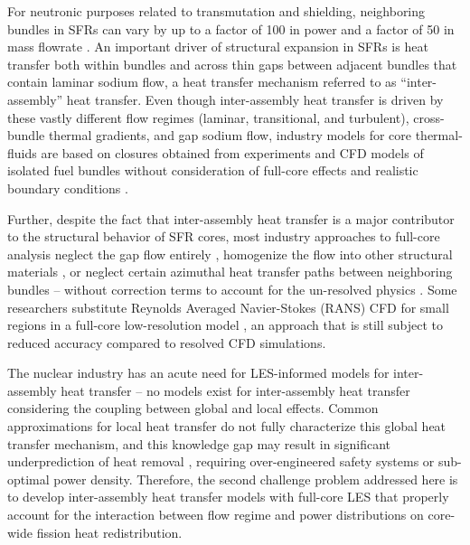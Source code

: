 For neutronic purposes related to transmutation and shielding, neighboring
bundles in SFRs can vary by up to a factor of 100 in power and a factor of 50 in mass
flowrate \cite{abr}. An important driver of structural
expansion in SFRs is heat transfer both within bundles and across thin gaps
between adjacent bundles that contain laminar sodium flow, a heat transfer
mechanism referred to as ``inter-assembly'' heat transfer. Even though
inter-assembly heat transfer is driven by these vastly different flow regimes
(laminar, transitional, and turbulent),
cross-bundle thermal gradients, and gap sodium flow, industry models for
core thermal-fluids are based on closures obtained from experiments and CFD
models of isolated fuel bundles without consideration of
full-core effects and realistic boundary conditions \cite{touran}.

Further, despite the fact that inter-assembly heat transfer is a major contributor
to the structural behavior of SFR cores, most industry approaches to full-core
analysis neglect the
gap flow entirely \cite{touran}, homogenize the flow into other structural
materials \cite{fiorina_of}, or neglect certain azimuthal heat transfer
paths between neighboring bundles \cite{touran} -- without correction terms to account for the
un-resolved physics \cite{touran,fiorina_of}. Some researchers substitute Reynolds
Averaged Navier-Stokes (RANS) CFD for small regions in a full-core low-resolution
model \cite{wang2020,gerschenfeld,Kim2020}, an approach that is still subject to
 reduced accuracy compared to resolved CFD simulations.

The nuclear industry has an acute need for LES-informed models for
inter-assembly heat transfer -- no models exist for inter-assembly heat
transfer considering the coupling between global and local effects. Common
approximations for local heat transfer do not fully characterize this
global heat transfer mechanism, and this knowledge gap
may result in significant
underprediction of heat removal \cite{gerschenfeld}, requiring over-engineered
safety systems or sub-optimal power density. Therefore, the second challenge
problem addressed here is to develop inter-assembly heat transfer models with
full-core LES that properly account for the interaction between flow regime and
power distributions on core-wide fission heat redistribution.


